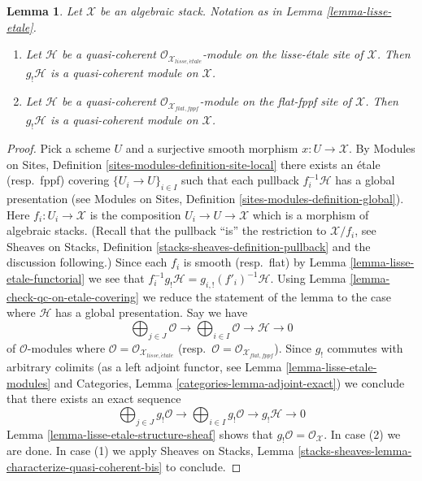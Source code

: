 \documentclass[10pt,a4paper]{amsart}
\theoremstyle{plain}
\newtheorem{lemma}[subsection]{Lemma}
\theoremstyle{definition}
\theoremstyle{remark}
\numberwithin{equation}{subsection}
\def\etale{{\acute{e}tale}}
\begin{document}
\begin{lemma}
\label{lemma-shriek-quasi-coherent}
Let $\mathcal{X}$ be an algebraic stack. Notation as in
Lemma \ref{lemma-lisse-etale}.
\begin{enumerate}
\item Let $\mathcal{H}$ be a quasi-coherent
$\mathcal{O}_{\mathcal{X}_{lisse,\etale}}$-module 
on the lisse-\'etale site of $\mathcal{X}$. Then $g_!\mathcal{H}$ is a
quasi-coherent module on $\mathcal{X}$.
\item Let $\mathcal{H}$ be a quasi-coherent
$\mathcal{O}_{\mathcal{X}_{flat,fppf}}$-module 
on the flat-fppf site of $\mathcal{X}$. Then $g_!\mathcal{H}$ is a
quasi-coherent module on $\mathcal{X}$.
\end{enumerate}
\end{lemma}

\begin{proof}
Pick a scheme $U$ and a surjective smooth morphism $x : U \to \mathcal{X}$.
By
Modules on Sites, Definition \ref{sites-modules-definition-site-local}
there exists an \'etale (resp.\ fppf) covering
$\{U_i \to U\}_{i \in I}$ such that each pullback $f_i^{-1}\mathcal{H}$
has a global presentation (see
Modules on Sites, Definition \ref{sites-modules-definition-global}).
Here $f_i : U_i \to \mathcal{X}$ is the composition
$U_i \to U \to \mathcal{X}$ which is a morphism of algebraic stacks.
(Recall that the pullback ``is'' the restriction to $\mathcal{X}/f_i$, see
Sheaves on Stacks, Definition \ref{stacks-sheaves-definition-pullback}
and the discussion following.) Since each $f_i$ is smooth (resp.\ flat) by
Lemma \ref{lemma-lisse-etale-functorial}
we see that $f_i^{-1}g_!\mathcal{H} = g_{i, !}(f'_i)^{-1}\mathcal{H}$.
Using Lemma \ref{lemma-check-qc-on-etale-covering}
we reduce the statement of the lemma to the case where $\mathcal{H}$
has a global presentation. Say we have
$$
\bigoplus\nolimits_{j \in J} \mathcal{O} \longrightarrow
\bigoplus\nolimits_{i \in I} \mathcal{O} \longrightarrow
\mathcal{H} \longrightarrow 0
$$
of $\mathcal{O}$-modules where
$\mathcal{O} = \mathcal{O}_{\mathcal{X}_{lisse,\etale}}$
(resp.\ $\mathcal{O} = \mathcal{O}_{\mathcal{X}_{flat,fppf}}$).
Since $g_!$ commutes with arbitrary colimits (as a left adjoint functor, see
Lemma \ref{lemma-lisse-etale-modules} and
Categories, Lemma \ref{categories-lemma-adjoint-exact})
we conclude that there exists an exact sequence
$$
\bigoplus\nolimits_{j \in J} g_!\mathcal{O} \longrightarrow
\bigoplus\nolimits_{i \in I} g_!\mathcal{O} \longrightarrow
g_!\mathcal{H} \longrightarrow 0
$$
Lemma \ref{lemma-lisse-etale-structure-sheaf}
shows that $g_!\mathcal{O} = \mathcal{O}_\mathcal{X}$.
In case (2) we are done. In case (1) we apply
Sheaves on Stacks, Lemma
\ref{stacks-sheaves-lemma-characterize-quasi-coherent-bis}
to conclude.
\end{proof}
\end{document}
